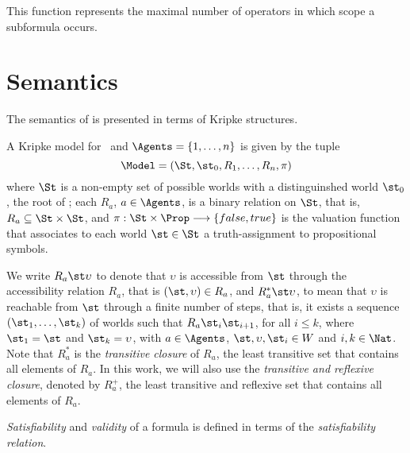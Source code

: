 This function represents the maximal number of operators in which scope a
subformula occurs.

\section{Semantics}
\label{semantics}

The semantics of  is presented in terms of Kripke structures.

\begin{definition}
\label{semantics}
    A Kripke model for \Prop~and $\Agents = \{1, \ldots, n\}$ is given by the tuple 
    \begin{equation}
        \Model = (\St, \st_0, R_1, \ldots, R_n, \pi)
    \end{equation}
    where $\St$ is a non-empty set of possible worlds with a distinguinshed world
    $\st_0$, the root of \Model; each $R_a$, $a \in \Agents$, is a binary relation
    on $\St$, that is, $R_a \subseteq \St \times \St$, and $\pi: \St \times \Prop
    \longrightarrow \{false, true\}$ is the valuation function that associates
    to each world $\st \in \St$ a truth-assignment to propositional symbols.
\end{definition}

We write $R_a \st \upsilon$ to denote that $\upsilon$ is accessible from $\st$ through
the accessibility relation $R_a$, that is $(\st, \upsilon) \in R_a$, and $R^*_a \st
\upsilon$, to mean that $\upsilon$ is reachable from $\st$ through a finite number of
steps, that is, it exists a sequence $(\st_1, \ldots, \st_k)$ of worlds such that
$R_a \st_i \st_{i+1}$, for all $i \leq k$, where $\st_1 = \st$ and $\st_k =
\upsilon$, with $a \in \Agents$, $\st, \upsilon, \st_i \in W$ and $i, k \in \Nat$. Note
that $R_a^*$ is the \emph{transitive closure} of $R_a$, the least transitive set
that contains all elements of $R_a$. In this work, we will also use the
\emph{transitive and reflexive closure}, denoted by $R_a^+$, the least
transitive and reflexive set that contains all elements of $R_a$.

\emph{Satisfiability} and \emph{validity} of a formula is defined in terms of the \emph{satisfiability relation}.

